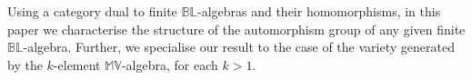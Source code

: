
Using a category dual to finite $\mathbb{BL}$-algebras and their homomorphisms,
in this paper
we characterise the structure of the automorphism group of any given finite $\mathbb{BL}$-algebra.
Further, we specialise
our result to the case of the variety generated by the $k$-element $\mathbb{MV}$-algebra, for each $k > 1$.


